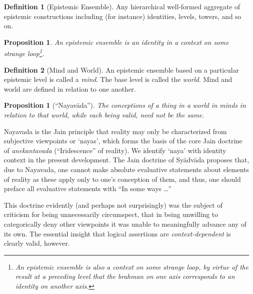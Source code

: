 \documentclass[pra,twocolumn,groupedaddress,10pt]{revtex4}
\newtheorem{proposition}[theorem]{Proposition}
\theoremstyle{definition}
\newtheorem{defn}{Definition}[section]
\begin{document}
\begin{enumerate}[label={[\textbf{\arabic*}]},start=0]
		\begin{defn}[Epistemic Ensemble]
			Any hierarchical well-formed aggregate of epistemic constructions including (for instance) identities, levels, towers, and so on.
		\end{defn}

		\begin{proposition}
			An epistemic ensemble is an identity in a context on some strange loop\footnote{An epistemic ensemble is also a context on some strange loop, by virtue of the result at a preceding level that the brahman on one axis corresponds to an identity on another axis.}.
		\end{proposition}

		\begin{defn}[Mind and World]
			An epistemic ensemble based on a particular epistemic level is called a \emph{mind}. The base level is called the \emph{world}. Mind and world are defined in relation to one another.
		\end{defn}

		\begin{proposition}[``Nayav\={a}da'']
			The conceptions of a thing in a world in minds in relation to that world, while each being valid, need not be the same.
		\end{proposition}

		Nayavada\cite{nayavada} is the Jain principle that reality may only be characterized from subjective viewpoints or `nayas', which forms the basis of the core Jain doctrine of \emph{anekantavada} (``Iridescence'' of reality). We identify `naya' with identity context in the present development. The Jain doctrine of Sy\={a}dv\={a}da proposes that, due to Nayavada, one cannot make absolute evaluative statements about elements of reality as these apply only to one's conception of them, and thus, one should preface all evaluative statements with ``In some ways \ldots''

		This doctrine evidently (and perhaps not surprisingly) was the subject of criticism\cite{anekantavada} for being unnecessarily circumspect, that in being unwilling to categorically deny other viewpoints it was unable to meaningfully advance any of its own. The essential insight that logical assertions are \emph{context-dependent} is clearly valid, however.


\end{enumerate}
\end{document}
